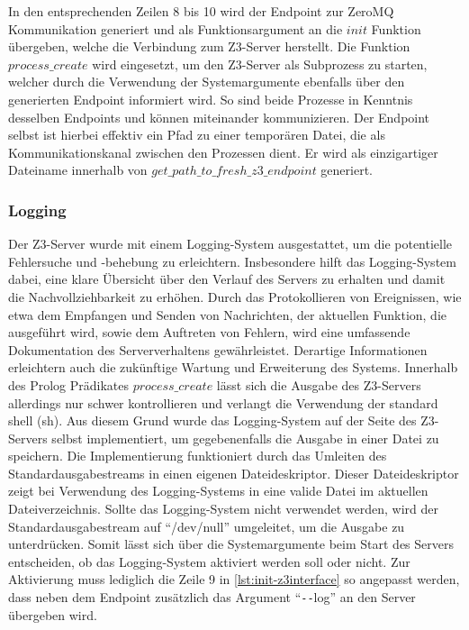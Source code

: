 In den entsprechenden Zeilen 8 bis 10 wird der Endpoint zur ZeroMQ Kommunikation generiert
und als Funktionsargument an die $init$ Funktion übergeben, welche die Verbindung zum Z3-Server herstellt.
Die Funktion $process\_create$ wird eingesetzt, um den Z3-Server als Subprozess zu starten,
welcher durch die Verwendung der Systemargumente ebenfalls über den generierten Endpoint informiert wird.
So sind beide Prozesse in Kenntnis desselben Endpoints und können miteinander kommunizieren.
Der Endpoint selbst ist hierbei effektiv ein Pfad zu einer temporären Datei, die als Kommunikationskanal zwischen den Prozessen dient.
Er wird als einzigartiger Dateiname innerhalb von $get\_path\_to\_fresh\_z3\_endpoint$ generiert.

\subsubsection{Logging}
\label{subsec:logging}

Der Z3-Server wurde mit einem Logging-System ausgestattet, um die potentielle Fehlersuche und -behebung zu erleichtern.
Insbesondere hilft das Logging-System dabei, eine klare Übersicht über den Verlauf des Servers zu erhalten und damit die Nachvollziehbarkeit zu erhöhen.
Durch das Protokollieren von Ereignissen, wie etwa dem Empfangen und Senden von Nachrichten, der aktuellen Funktion, die ausgeführt wird, sowie dem Auftreten von Fehlern,
wird eine umfassende Dokumentation des Serververhaltens gewährleistet.
Derartige Informationen erleichtern auch die zukünftige Wartung und Erweiterung des Systems.
Innerhalb des Prolog Prädikates $process\_create$ lässt sich die Ausgabe des Z3-Servers allerdings nur schwer kontrollieren und verlangt die Verwendung der standard shell (sh).
Aus diesem Grund wurde das Logging-System auf der Seite des Z3-Servers selbst implementiert, um gegebenenfalls die Ausgabe in einer Datei zu speichern.
Die Implementierung funktioniert durch das Umleiten des Standardausgabestreams in einen eigenen Dateideskriptor.
Dieser Dateideskriptor zeigt bei Verwendung des Logging-Systems in eine valide Datei im aktuellen Dateiverzeichnis.
Sollte das Logging-System nicht verwendet werden, wird der Standardausgabestream auf \enquote{/dev/null} umgeleitet, um die Ausgabe zu unterdrücken.
Somit lässt sich über die Systemargumente beim Start des Servers entscheiden, ob das Logging-System aktiviert werden soll oder nicht.
Zur Aktivierung muss lediglich die Zeile 9 in \cref{lst:init-z3interface} so angepasst werden, dass neben dem Endpoint zusätzlich das Argument \enquote{\texttt{-}\texttt{-}log} an den Server übergeben wird.


